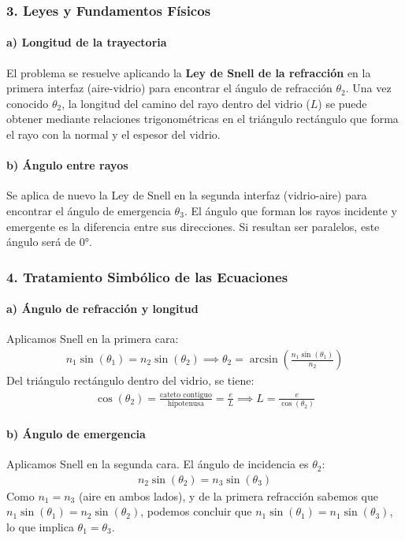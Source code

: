\subsubsection*{3. Leyes y Fundamentos Físicos}
\paragraph{a) Longitud de la trayectoria}
El problema se resuelve aplicando la \textbf{Ley de Snell de la refracción} en la primera interfaz (aire-vidrio) para encontrar el ángulo de refracción $\theta_2$. Una vez conocido $\theta_2$, la longitud del camino del rayo dentro del vidrio ($L$) se puede obtener mediante relaciones trigonométricas en el triángulo rectángulo que forma el rayo con la normal y el espesor del vidrio.

\paragraph{b) Ángulo entre rayos}
Se aplica de nuevo la Ley de Snell en la segunda interfaz (vidrio-aire) para encontrar el ángulo de emergencia $\theta_3$. El ángulo que forman los rayos incidente y emergente es la diferencia entre sus direcciones. Si resultan ser paralelos, este ángulo será de 0°.

\subsubsection*{4. Tratamiento Simbólico de las Ecuaciones}
\paragraph{a) Ángulo de refracción y longitud}
Aplicamos Snell en la primera cara:
\begin{gather}
    n_1 \sin(\theta_1) = n_2 \sin(\theta_2) \implies \theta_2 = \arcsin\left(\frac{n_1 \sin(\theta_1)}{n_2}\right)
\end{gather}
Del triángulo rectángulo dentro del vidrio, se tiene:
\begin{gather}
    \cos(\theta_2) = \frac{\text{cateto contiguo}}{\text{hipotenusa}} = \frac{e}{L} \implies L = \frac{e}{\cos(\theta_2)}
\end{gather}

\paragraph{b) Ángulo de emergencia}
Aplicamos Snell en la segunda cara. El ángulo de incidencia es $\theta_2$:
\begin{gather}
    n_2 \sin(\theta_2) = n_3 \sin(\theta_3)
\end{gather}
Como $n_1 = n_3$ (aire en ambos lados), y de la primera refracción sabemos que $n_1 \sin(\theta_1) = n_2 \sin(\theta_2)$, podemos concluir que $n_1 \sin(\theta_1) = n_1 \sin(\theta_3)$, lo que implica $\theta_1 = \theta_3$.

